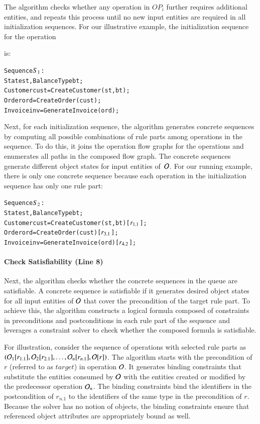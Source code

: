 The algorithm checks whether any operation in $OP_i$ further requires additional
entities, and repeats this process until no new input entities are required in
all initialization sequences.  For our illustrative example, the initialization
sequence for the operation \subject{GenerateInvoice} is:

\vspace*{-4pt}
{\scriptsize
\begin{alltt}
 Sequence \(S\sb{1}\):
 State st, BalanceType bt;
 Customer cust = CreateCustomer(st, bt);  
 Order ord = CreateOrder(cust);
 Invoice inv = GenerateInvoice(ord);  
\end{alltt}
}
\vspace*{-5pt}

Next, for each initialization sequence, the algorithm generates concrete
sequences by computing all possible combinations of rule parts among operations
in the sequence. To do this, it joins the operation flow graphs for the
operations and enumerates all paths in the composed flow graph. The concrete
sequences generate different object states for input entities of~${\cal O}$. For
our running example, there is only one concrete sequence because each operation
in the initialization sequence has only one rule part:

\vspace*{-4pt}
{\scriptsize
\begin{alltt}
 Sequence \(S\sb{2}\):
 State st, BalanceType bt;
 Customer cust = CreateCustomer(st, bt) [\(r\sb{1.1}\)];
 Order ord = CreateOrder(cust) [\(r\sb{3.1}\)];	
 Invoice inv = GenerateInvoice(ord) [\(r\sb{4.2}\)];  
\end{alltt}
}
\vspace*{-5pt}

\vskip -7pt
\paragraph*{Check Satisfiability (Line 8)} Next, the algorithm checks whe\-ther 
the concrete sequences in the queue are satisfiable. A concrete sequence is
satisfiable if it generates desired object states for all input entities of
${\cal O}$ that cover the precondition of the target rule part. To achieve this,
the algorithm constructs a logical formula composed of constraints in
preconditions and postconditions in each rule part of the sequence and leverages
a constraint solver to check whether the composed formula is satisfiable.

For illustration, consider the sequence of operations with selected rule parts
as $({\cal O}_1 [r_{1.1}], {\cal O}_2 [r_{2.1}], \ldots, {\cal O}_n [r_{n.1}],
{\cal O} [r])$.  The algorithm starts with the precondition of $r$ (referred to
as $target$) in operation ${\cal O}$.  It generates binding constraints that
substitute the entities consumed by ${\cal O}$ with the entities created or
modified by the predecessor operation ${\cal O}_n$. The binding constraints bind
the identifiers in the postcondition of $r_{n.1}$ to the identifiers of the same
type in the precondition of $r$. Because the solver has no notion of objects,
the binding constraints ensure that referenced object attributes are
appropriately bound as well.

